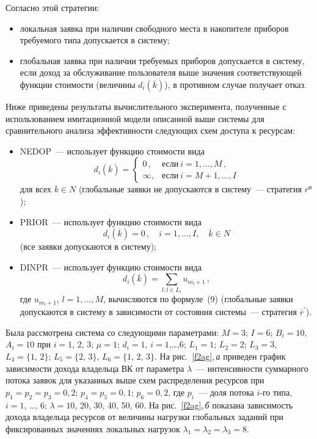 \begin{multicols}{2}
  Согласно этой стратегии:
  \begin{itemize}
\item локальная заявка при наличии свободного мес\-та в накопителе приборов
требуемого типа допускается в систему;
\item глобальная заявка при наличии требуемых приборов допускается в
систему, если доход за обслуживание пользователя выше значения
соответствующей функции стоимости (величины $d_i (\overline{k})$), в
противном случае получает отказ.
  \end{itemize}
  

  Ниже приведены результаты вычислительного эксперимента, полученные с
использованием имитационной модели описанной выше системы для
сравнительного анализа эффективности сле\-ду\-ющих схем доступа к ресурсам:
  \begin{itemize}
  \item
NEDOP~--- использует функцию стоимости \mbox{вида}
$$
d_i (\overline{k}) =
\begin{cases}
0\,, & \mbox{если} \ i=1,\ldots , M\,,\\
\infty, & \mbox{если} \ i=M+1, \ldots , I
\end{cases}
$$
для всех $\overline{k} \in N$ (глобальные заявки не допускаются в сис\-те\-му~---
стратегия $\overline{r}^{\mathrm{н}}$);
\item PRIOR~--- использует функцию стоимости вида
$$
d_i (\overline{k}) = 0\,,\quad i=1,\ldots , I, \quad \overline{k} \in N
$$
(все заявки допускаются в сис\-те\-му);
\item DINPR~--- использует функцию стоимости вида
$$
d_i (\overline{k}) =\sum \limits_{{l:} l\in L_i}u_{m_l+1}\,,
$$
где $u_{m_l+1}$, $l=1,\ldots , M$, вычисляются по формуле~(9)
(глобальные заявки допускаются в сис\-те\-му в зависимости от состояния
системы~--- стратегия $\overline{r}^\prime$).
  \end{itemize}

  Была рассмотрена система со следующими параметрами: $M = 3$; $I = 6$;
$B_i =10$, $A_i = 10$ при $i = 1$, 2, 3; $\mu = 1$; $d_i = 1$, $i = 1$,\ldots ,6;
$L_1 = 1$; $L_2 = 2$; $L_3 = 3$, $L_4 = \{1,\,2\}$; $L_5 = \{2,\,3\}$, $L_6 =
\{1,\,2,\,3\}$. На рис.~\ref{f2ag},\,\textit{а} приведен график зависимости дохода владельца
ВК от параметра $\lambda$~--- интенсивности суммарного потока заявок для
указанных выше схем распределения ресурсов при $p_1 = p_2 = p_3 = 0{,}2$;
$p_4 = p_5 = 0{,}1$; $p_6 = 0{,}2$, где $p_i$~--- доля потока $i$-го типа, $i =
1$, \ldots , 6; $\lambda = 10$, 20, 30, 40, 50, 60. На рис.~\ref{f2ag},\,\textit{б} показана
зависимость дохода владельца ресурсов от величины нагрузки глобальных
заданий при фиксированных значениях локальных нагрузок $\lambda_1 =
\lambda_2 = \lambda_3 = 8$.



\end{multicols}
